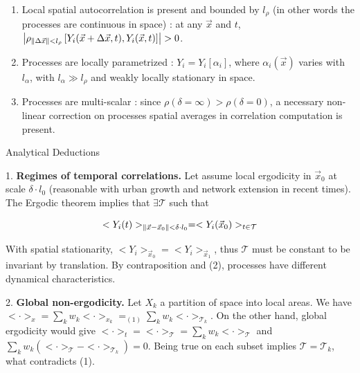 \bigskip

\begin{enumerate}
\item Local spatial autocorrelation is present and bounded by $l_{\rho}$ (in other words the processes are continuous in space) : at any $\vec{x}$ and $t$, $\left|\rho_{\| \Delta \vec{x} \| < l_{\rho}}\left[Y_i (\vec{x}+\Delta \vec{x},t), Y_i (\vec{x},t) \right]\right| > 0$.
\medskip
\item Processes are locally parametrized : $Y_i = Y_i\left[\alpha_i\right]$, where $\alpha_i (\vec{x})$ varies with $l_{\alpha}$, with $l_{\alpha} \gg l_{\rho}$ and weakly locally stationary in space.
\medskip
\item Processes are multi-scalar : since $\rho(\delta = \infty) > \rho (\delta = 0 )$, a necessary non-linear correction on processes spatial averages in correlation computation is present.
\end{enumerate}



Analytical Deductions

1. \textbf{Regimes of temporal correlations.} Let assume local ergodicity in $\vec{x}_0$ at scale $\delta \cdot l_0$ (reasonable with urban growth and network extension in recent times). The Ergodic theorem implies that $\exists \mathcal{T}$ such that

\[<Y_i (t) >_{\| \vec{x}-\vec{x}_0 \| < \delta\cdot l_0} = <Y_i (\vec{x}_0)>_{t\in \mathcal{T}}\] 

With spatial stationarity, $<Y_i>_{\vec{x}_0}=<Y_i>_{\vec{x}_1}$, thus $\mathcal{T}$ must be constant to be invariant by translation. By contraposition and (2), processes have different dynamical characteristics.

\bigskip

2. \textbf{Global non-ergodicity.} Let $X_k$ a partition of space into local areas. We have $<\cdot>_x = \sum_k w_k <\cdot>_{x_k} =_{(1)} \sum_k w_k <\cdot>_{\mathcal{T}_k} $. On the other hand, global ergodicity would give $<\cdot>_t = <\cdot>_{\mathcal{T}} = \sum_k w_k <\cdot>_{\mathcal{T}}$ and $\sum_k w_k \left(<\cdot>_{\mathcal{T}} - <\cdot>_{\mathcal{T}_k}\right) = 0$. Being true on each subset implies $\mathcal{T}=\mathcal{T}_k$, what contradicts (1).





